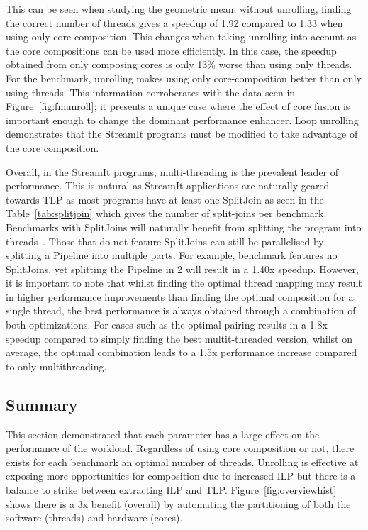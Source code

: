 This can be seen when studying the geometric mean, without unrolling, finding the correct number of threads gives a speedup of 1.92 compared to 1.33 when using only core composition.
This changes when taking unrolling into account as the core compositions can be used more efficiently.
In this case, the speedup obtained from only composing cores is only 13\% worse than using only threads.
For the  benchmark, unrolling makes using only core-composition better than only using threads.
This information corroberates with the data seen in Figure~\ref{fig:fmunroll}; it presents a unique case where the effect of core fusion is important enough to change the dominant performance enhancer.
Loop unrolling demonstrates that the StreamIt programs must be modified to take advantage of the core composition.

Overall, in the StreamIt programs, multi-threading is the prevalent leader of performance.
This is natural as StreamIt applications are naturally geared towards TLP as most programs have at least one SplitJoin as seen in the Table~\ref{tab:splitjoin} which gives the number of split-joins per benchmark.
Benchmarks with SplitJoins will naturally benefit from splitting the program into threads~\cite{thiesStreamit2010}.
Those that do not feature SplitJoins can still be parallelised by splitting a Pipeline into multiple parts.
For example, benchmark  features no SplitJoins, yet splitting the Pipeline in 2 will result in a 1.40x speedup.
However, it is important to note that whilst finding the optimal thread mapping may result in higher performance improvements than finding the optimal composition for a single thread, the best performance is always obtained through a combination of both optimizations.
For cases such as  the optimal pairing results in a 1.8x speedup compared to simply finding the best multit-threaded version, whilst on average, the optimal combination leads to a 1.5x performance increase compared to only multithreading.

\subsection{Summary}
This section demonstrated that each parameter has a large effect on the performance of the workload.
Regardless of using core composition or not, there exists for each benchmark an optimal number of threads.
Unrolling is effective at exposing more opportunities for composition due to increased ILP but there is a balance to strike between extracting ILP and TLP.
Figure~\ref{fig:overviewhist} shows there is a 3x benefit (overall) by automating the partitioning of both the software (threads) and hardware (cores).

